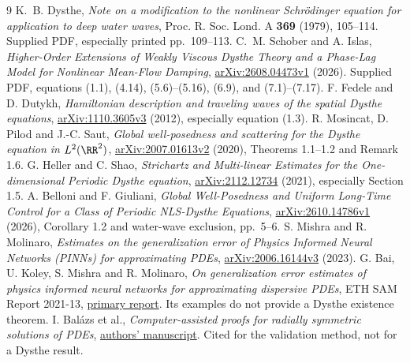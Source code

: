 \documentclass[11pt]{article}
\begin{document}
\clearpage
\begin{thebibliography}{9}
K.~B. Dysthe, \emph{Note on a modification to the nonlinear
Schr\"odinger equation for application to deep water waves},
Proc. R. Soc. Lond. A \textbf{369} (1979), 105--114.
Supplied PDF, especially printed pp.~109--113.
C.~M. Schober and A. Islas,
\emph{Higher-Order Extensions of Weakly Viscous Dysthe Theory and
a Phase-Lag Model for Nonlinear Mean-Flow Damping},
\href{https://arxiv.org/abs/2608.04473v1}{arXiv:2608.04473v1}
(2026). Supplied PDF, equations (1.1), (4.14),
(5.6)--(5.16), (6.9), and (7.1)--(7.17).
F. Fedele and D. Dutykh,
\emph{Hamiltonian description and traveling waves of the spatial
Dysthe equations},
\href{https://arxiv.org/abs/1110.3605}{arXiv:1110.3605v3}
(2012), especially equation (1.3).
R. Mosincat, D. Pilod and J.-C. Saut,
\emph{Global well-posedness and scattering for the Dysthe equation
in \(L^2(\RR^2)\)},
\href{https://arxiv.org/abs/2007.01613}{arXiv:2007.01613v2}
(2020), Theorems 1.1--1.2 and Remark 1.6.
G. Heller and C. Shao,
\emph{Strichartz and Multi-linear Estimates for the
One-dimensional Periodic Dysthe equation},
\href{https://arxiv.org/abs/2112.12734}{arXiv:2112.12734}
(2021), especially Section 1.5.
A. Belloni and F. Giuliani,
\emph{Global Well-Posedness and Uniform Long-Time Control for a
Class of Periodic NLS-Dysthe Equations},
\href{https://arxiv.org/abs/2610.14786}{arXiv:2610.14786v1}
(2026), Corollary 1.2 and water-wave exclusion, pp.~5--6.
S. Mishra and R. Molinaro,
\emph{Estimates on the generalization error of Physics Informed
Neural Networks (PINNs) for approximating PDEs},
\href{https://arxiv.org/abs/2006.16144}{arXiv:2006.16144v3}
(2023).
G. Bai, U. Koley, S. Mishra and R. Molinaro,
\emph{On generalization error estimates of physics informed neural
networks for approximating dispersive PDEs}, ETH SAM Report 2021-13,
\href{https://www.sam.math.ethz.ch/sam_reports/reports_final/reports2021/2021-13_rev1.pdf}{primary report}.
Its examples do not provide a Dysthe existence theorem.
I. Bal\'azs et al.,
\emph{Computer-assisted proofs for radially symmetric solutions
of PDEs},
\href{https://www.math.mcgill.ca/jplessard/PDEs_files/compuproofsDEs.pdf}{authors' manuscript}.
Cited for the validation method, not for a Dysthe result.
\end{thebibliography}
\end{document}
